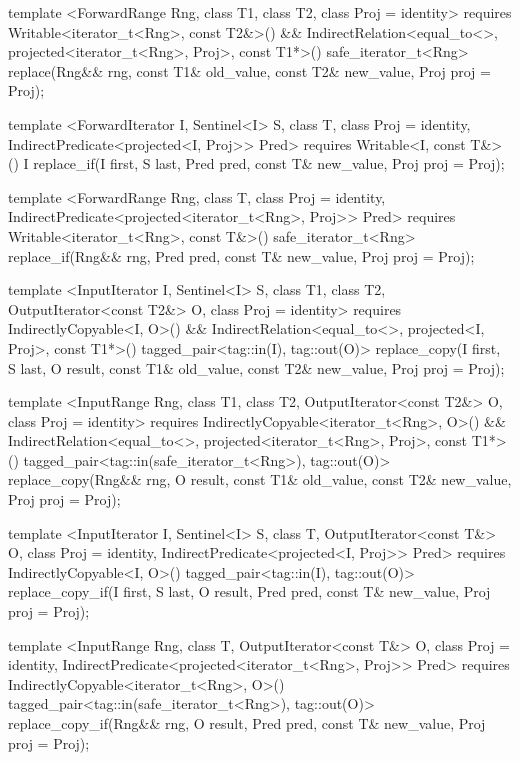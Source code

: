 \begin{codeblock}
{{{{  template <ForwardRange Rng, class T1, class T2, class Proj = identity>
    requires Writable<iterator_t<Rng>, const T2&>() &&
      IndirectRelation<equal_to<>, projected<iterator_t<Rng>, Proj>, const T1*>()
    safe_iterator_t<Rng>
      replace(Rng&& rng, const T1& old_value, const T2& new_value, Proj proj = Proj{});

  template <ForwardIterator I, Sentinel<I> S, class T, class Proj = identity,
      IndirectPredicate<projected<I, Proj>> Pred>
    requires Writable<I, const T&>()
    I
      replace_if(I first, S last, Pred pred, const T& new_value, Proj proj = Proj{});

  template <ForwardRange Rng, class T, class Proj = identity,
      IndirectPredicate<projected<iterator_t<Rng>, Proj>> Pred>
    requires Writable<iterator_t<Rng>, const T&>()
    safe_iterator_t<Rng>
      replace_if(Rng&& rng, Pred pred, const T& new_value, Proj proj = Proj{});

  template <InputIterator I, Sentinel<I> S, class T1, class T2, OutputIterator<const T2&> O,
      class Proj = identity>
    requires IndirectlyCopyable<I, O>() &&
      IndirectRelation<equal_to<>, projected<I, Proj>, const T1*>()
    tagged_pair<tag::in(I), tag::out(O)>
      replace_copy(I first, S last, O result, const T1& old_value, const T2& new_value,
                   Proj proj = Proj{});

  template <InputRange Rng, class T1, class T2, OutputIterator<const T2&> O,
      class Proj = identity>
    requires IndirectlyCopyable<iterator_t<Rng>, O>() &&
      IndirectRelation<equal_to<>, projected<iterator_t<Rng>, Proj>, const T1*>()
    tagged_pair<tag::in(safe_iterator_t<Rng>), tag::out(O)>
      replace_copy(Rng&& rng, O result, const T1& old_value, const T2& new_value,
                   Proj proj = Proj{});

  template <InputIterator I, Sentinel<I> S, class T, OutputIterator<const T&> O,
      class Proj = identity, IndirectPredicate<projected<I, Proj>> Pred>
    requires IndirectlyCopyable<I, O>()
    tagged_pair<tag::in(I), tag::out(O)>
      replace_copy_if(I first, S last, O result, Pred pred, const T& new_value,
                      Proj proj = Proj{});

  template <InputRange Rng, class T, OutputIterator<const T&> O, class Proj = identity,
      IndirectPredicate<projected<iterator_t<Rng>, Proj>> Pred>
    requires IndirectlyCopyable<iterator_t<Rng>, O>()
    tagged_pair<tag::in(safe_iterator_t<Rng>), tag::out(O)>
      replace_copy_if(Rng&& rng, O result, Pred pred, const T& new_value,
                      Proj proj = Proj{});

}}}}
\end{codeblock}
